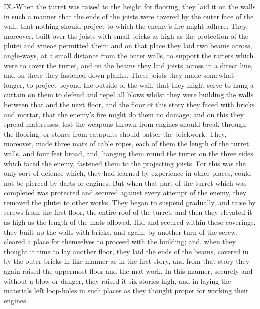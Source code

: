 IX.-When the turret was raised to the height for flooring, they laid it
on the walls in such a manner that the ends of the joists were covered
by the outer face of the wall, that nothing should project to which the
enemy's fire might adhere. They, moreover, built over the joists with
small bricks as high as the protection of the plutei and vineae
permitted them; and on that place they laid two beams across, angle-ways,
at a small distance from the outer walls, to support the rafters
which were to cover the turret, and on the beams they laid joists across
in a direct line, and on these they fastened down planks. These joists
they made somewhat longer, to project beyond the outside of the wall,
that they might serve to hang a curtain on them to defend and repel all
blows whilst they were building the walls between that and the next
floor, and the floor of this story they faced with bricks and mortar,
that the enemy's fire might do them no damage; and on this they spread
mattresses, lest the weapons thrown from engines should break through
the flooring, or stones from catapults should batter the brickwork.
They, moreover, made three mats of cable ropes, each of them the length
of the turret walls, and four feet broad, and, hanging them round the
turret on the three sides which faced the enemy, fastened them to the
projecting joists. For this was the only sort of defence which, they had
learned by experience in other places, could not be pierced by darts or
engines. But when that part of the turret which was completed was
protected and secured against every attempt of the enemy, they removed
the plutei to other works. They began to suspend gradually, and raise by
screws from the first-floor, the entire roof of the turret, and then
they elevated it as high as the length of the mats allowed. Hid and
secured within these coverings, they built up the walls with bricks, and
again, by another turn of the screw, cleared a place for themselves to
proceed with the building; and, when they thought it time to lay another
floor, they laid the ends of the beams, covered in by the outer bricks
in like manner as in the first story, and from that story they again
raised the uppermost floor and the mat-work. In this manner, securely
and without a blow or danger, they raised it six stories high, and in
laying the materials left loop-holes in such places as they thought
proper for working their engines.

